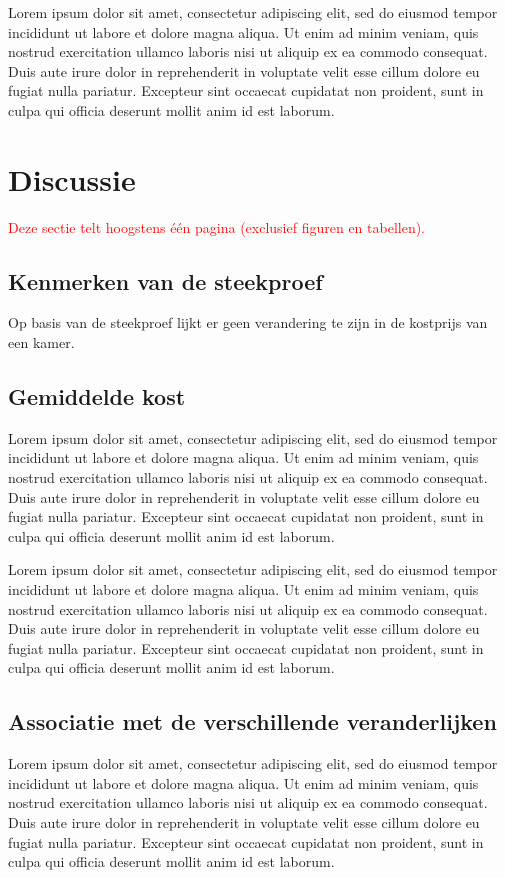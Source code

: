 \documentclass[a4paper]{kulakarticle}
\newcommand{\rood}[1]{\textcolor{red}{#1}}
\begin{document}
	Lorem ipsum dolor sit amet, consectetur adipiscing elit, sed do eiusmod tempor incididunt ut labore et dolore magna aliqua. Ut enim ad minim veniam, quis nostrud exercitation ullamco laboris nisi ut aliquip ex ea commodo consequat. Duis aute irure dolor in reprehenderit in voluptate velit esse cillum dolore eu fugiat nulla pariatur. Excepteur sint occaecat cupidatat non proident, sunt in culpa qui officia deserunt mollit anim id est laborum.
	
	\section{Discussie}
	\rood{Deze sectie telt hoogstens één pagina (exclusief figuren en tabellen).}
	\subsection{Kenmerken van de steekproef}
Op basis van de steekproef lijkt er geen verandering te zijn in de kostprijs van een kamer.
	
	\subsection{Gemiddelde kost}
	Lorem ipsum dolor sit amet, consectetur adipiscing elit, sed do eiusmod tempor incididunt ut labore et dolore magna aliqua. Ut enim ad minim veniam, quis nostrud exercitation ullamco laboris nisi ut aliquip ex ea commodo consequat. Duis aute irure dolor in reprehenderit in voluptate velit esse cillum dolore eu fugiat nulla pariatur. Excepteur sint occaecat cupidatat non proident, sunt in culpa qui officia deserunt mollit anim id est laborum.
	
	Lorem ipsum dolor sit amet, consectetur adipiscing elit, sed do eiusmod tempor incididunt ut labore et dolore magna aliqua. Ut enim ad minim veniam, quis nostrud exercitation ullamco laboris nisi ut aliquip ex ea commodo consequat. Duis aute irure dolor in reprehenderit in voluptate velit esse cillum dolore eu fugiat nulla pariatur. Excepteur sint occaecat cupidatat non proident, sunt in culpa qui officia deserunt mollit anim id est laborum.
	
	\subsection{Associatie met de verschillende veranderlijken}
	Lorem ipsum dolor sit amet, consectetur adipiscing elit, sed do eiusmod tempor incididunt ut labore et dolore magna aliqua. Ut enim ad minim veniam, quis nostrud exercitation ullamco laboris nisi ut aliquip ex ea commodo consequat. Duis aute irure dolor in reprehenderit in voluptate velit esse cillum dolore eu fugiat nulla pariatur. Excepteur sint occaecat cupidatat non proident, sunt in culpa qui officia deserunt mollit anim id est laborum.
	
\end{document}
